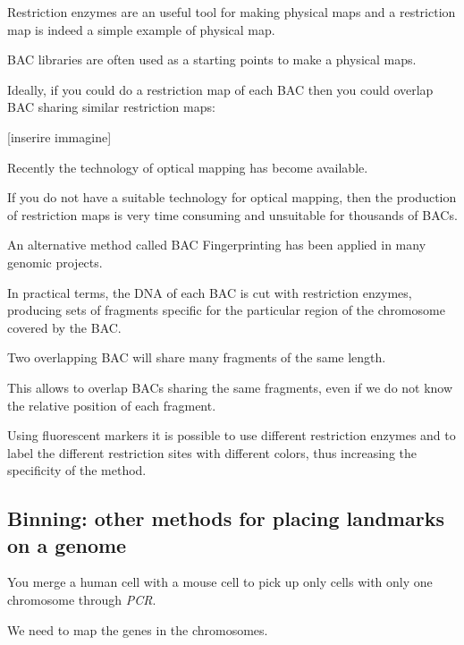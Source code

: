 Restriction enzymes are an useful tool for making physical maps and a
restriction map is indeed a simple example of physical map.

BAC libraries are often used as a starting points to make a physical maps.

Ideally, if you could do a restriction map of each BAC then you could overlap
BAC sharing similar restriction maps:

[inserire immagine]

Recently the technology of optical mapping has become available.

If you do not have a suitable technology for optical mapping, then the
production of restriction maps is very time consuming and unsuitable for
thousands of BACs.

An alternative method called BAC Fingerprinting has been applied in many
genomic projects.

In practical terms, the DNA of each BAC is cut with restriction enzymes,
producing sets of fragments specific for the particular region of the
chromosome covered by the BAC.

Two overlapping BAC will share many fragments of the same length.

This allows to overlap BACs sharing the same fragments, even if we do not know
the relative position of each fragment.

Using fluorescent markers it is possible to use different restriction enzymes
and to label the different restriction sites with different colors, thus
increasing the specificity of the method.

\subsection{Binning: other methods for placing landmarks on a genome}

You merge a human cell with a mouse cell to pick up only cells with only one
chromosome through \textit{PCR}.

We need to map the genes in the chromosomes.

